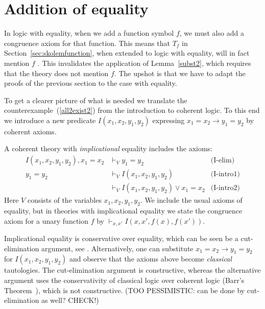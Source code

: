 \documentclass[10pt,a4paper]{article}
\begin{document}

\section{Addition of equality}\label{sec:addequality}

In logic with equality, when we add a function symbol $f$, 
we must also add a congruence axiom for that function. 
This means that $T_f$ in Section~\ref{sec:skolemfunction},
when extended to  logic with equality, will in fact mention $f$ . 
This invalidates the application of Lemma~\ref{subst2}, 
which requires that the theory does not mention $f$.
The upshot is that we have to adapt the proofs of the
previous section to the case with equality.

To get a clearer picture of what is needed we translate the 
counterexample~(\ref{all2exist2}) from the introduction to coherent logic.
To this end we introduce a new predicate $I(x_1,x_2,y_1,y_2)$
expressing $x_1=x_2 \to y_1=y_2$ by coherent axioms.

\begin{definition}\label{def:implicational_equality}
A coherent theory with \emph{implicational} equality includes the axioms:
\begin{align*}
 I(x_1,x_2,y_1,y_2), x_1=x_2 & \vdash_V                 y_1=y_2  &\text{(I-elim)}\\
 y_1=y_2                                  &\vdash_V                 I(x_1,x_2,y_1,y_2)&\text{(I-intro1)}\\ 
                                                 &\vdash_V                 I(x_1,x_2,y_1,y_2) \lor x_1= x_2&\text{(I-intro2)}
\end{align*}
Here $V$ consists of  the variables $x_1,x_2,y_1,y_2$.
We include the usual axioms of equality, but
in theories with implicational equality we state the congruence axiom for 
a unary function $f$ by $\vdash_{x,x'} I(x,x',f(x),f(x'))$.
\end{definition}

Implicational equality is conservative over equality, which can be seen be a
cut-elimination argument, see \cite[THM?]{CLR}. 
Alternatively, one can substitute $x_1=x_2 \to y_1=y_2$
for $I(x_1,x_2,y_1,y_2)$ and observe that the axioms above become
\emph{classical} tautologies. The cut-elimination argument is constructive, whereas
the alternative argument uses the conservativity of classical logic over
coherent logic (Barr's Theorem~\cite{Barr}), which is not constructive.
(TOO PESSIMISTIC: can be done by cut-elimination as well? CHECK!)
\end{document}
